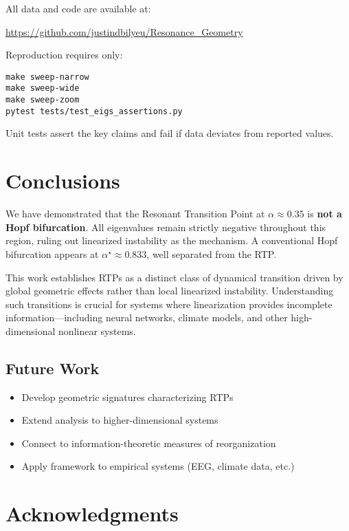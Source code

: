 \documentclass[11pt,twocolumn]{article}
\begin{document}
All data and code are available at:
\begin{center}
\url{https://github.com/justindbilyeu/Resonance_Geometry}
\end{center}

Reproduction requires only:
\begin{verbatim}
make sweep-narrow
make sweep-wide
make sweep-zoom
pytest tests/test_eigs_assertions.py
\end{verbatim}

Unit tests assert the key claims and fail if data deviates from reported values.

\section{Conclusions}

We have demonstrated that the Resonant Transition Point at $\alpha \approx 0.35$ is \textbf{not a Hopf
bifurcation}. All eigenvalues remain strictly negative throughout this region, ruling out linearized instability
as the mechanism. A conventional Hopf bifurcation appears at $\alpha^\star \approx 0.833$, well separated from
the RTP.

This work establishes RTPs as a distinct class of dynamical transition driven by global geometric effects rather
than local linearized instability. Understanding such transitions is crucial for systems where linearization
provides incomplete information—including neural networks, climate models, and other high-dimensional nonlinear
systems.

\subsection{Future Work}

\begin{itemize}
  \item Develop geometric signatures characterizing RTPs
  \item Extend analysis to higher-dimensional systems
  \item Connect to information-theoretic measures of reorganization
  \item Apply framework to empirical systems (EEG, climate data, etc.)
\end{itemize}

\section*{Acknowledgments}
\end{document}
